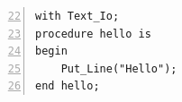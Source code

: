 \lstset{language=Ada, caption=An example}
\begin{lstlisting}[firstnumber=22,frame=single,    numbers=left, numbersep=5pt]
with Text_Io;
procedure hello is
begin
    Put_Line("Hello");
end hello;
\end{lstlisting}